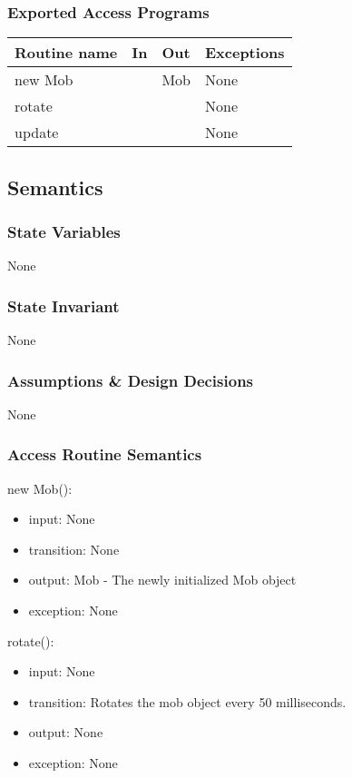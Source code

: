 \documentclass[12pt, titlepage]{article}
\begin{document}
\subsubsection* {Exported Access Programs}

\begin{tabular}{| l | l | l | p{5cm} |}
\hline
\textbf{Routine name} & \textbf{In} & \textbf{Out} & \textbf{Exceptions}\\
\hline
new Mob & & Mob & None\\
\hline
rotate & & & None\\
\hline
update & & & None\\
\hline
\end{tabular}

\subsection* {Semantics}

\subsubsection* {State Variables}

None

\subsubsection* {State Invariant}

None

\subsubsection* {Assumptions \& Design Decisions}

None

\subsubsection* {Access Routine Semantics}

\noindent new Mob():
\begin{itemize}
\item input: None
\item transition: None
\item output: Mob - The newly initialized Mob object
\item exception: None
\end{itemize}

\noindent rotate():
\begin{itemize}
\item input: None
\item transition: Rotates the mob object every 50 milliseconds.
\item output: None
\item exception: None
\end{itemize}
\end{document}
